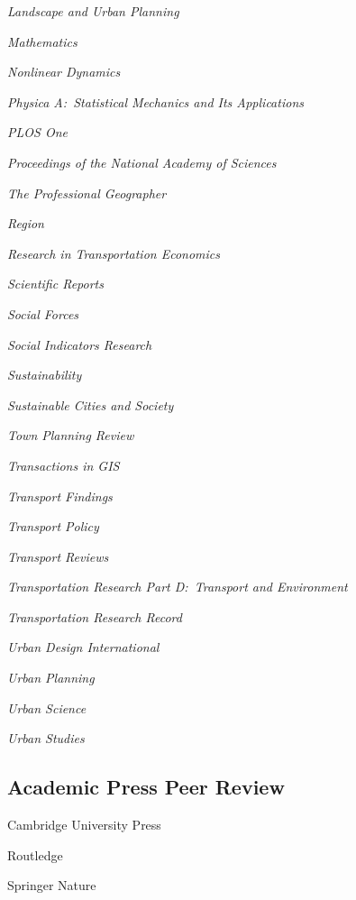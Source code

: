 \documentclass[12pt,letterpaper]{report}
\newcommand{\listitemspace}{0.25em}
\renewenvironment{itemize}
{\begin{list}{}{\setlength{\leftmargin}{0em}
                \setlength{\parskip}{0em}
                \setlength{\itemsep}{\listitemspace}
                \setlength{\parsep}{\listitemspace}}}
{\end{list}}
\begin{document}
\begin{itemize}
        \item \textit{Landscape and Urban Planning}
        \item \textit{Mathematics}
        \item \textit{Nonlinear Dynamics}
        \item \textit{Physica A:\ Statistical Mechanics and Its Applications}
        \item \textit{PLOS One}
        \item \textit{Proceedings of the National Academy of Sciences}
        \item \textit{The Professional Geographer}
        \item \textit{Region}
        \item \textit{Research in Transportation Economics}
        \item \textit{Scientific Reports}
        \item \textit{Social Forces}
        \item \textit{Social Indicators Research}
        \item \textit{Sustainability}
        \item \textit{Sustainable Cities and Society}
        \item \textit{Town Planning Review}
        \item \textit{Transactions in GIS}
        \item \textit{Transport Findings}
        \item \textit{Transport Policy}
        \item \textit{Transport Reviews}
        \item \textit{Transportation Research Part D:\ Transport and Environment}
        \item \textit{Transportation Research Record}
        \item \textit{Urban Design International}
        \item \textit{Urban Planning}
        \item \textit{Urban Science}
        \item \textit{Urban Studies}

    \end{itemize}

    \subsection*{Academic Press Peer Review}

    \begin{itemize}

        \item Cambridge University Press
        \item Routledge
        \item Springer Nature

    \end{itemize}
\end{document}
